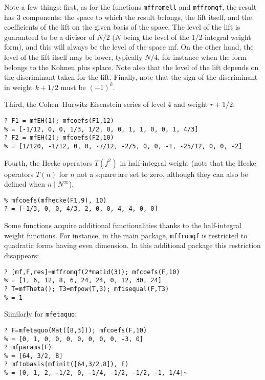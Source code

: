 \documentclass[11pt]{article}
\def\kbd#1{{\tt #1}}
\begin{document}
Note a few things: first, as for the functions \kbd{mffromell} and
\kbd{mffromqf}, the result has 3 components: the space to which the result
belongs, the lift itself, and the coefficients of the lift on the given basis
of the space. The level of the lift is guaranteed to be a divisor of $N/2$
($N$ being the level of the 1/2-integral weight form), and this will always
be the level of the space mf. On the other hand, the level of the lift itself
may be lower, typically $N/4$, for instance when the form belongs to the
Kohnen plus splace. Note also that the level of the lift depends on the
discriminant taken for the lift. Finally, note that the sign of the
discriminant in weight $k+1/2$ must be $(-1)^k$.

\smallskip

Third, the Cohen--Hurwitz Eisenstein series of level $4$ and weight $r+1/2$:

\begin{verbatim}
? F1 = mfEH(1); mfcoefs(F1,12)
% = [-1/12, 0, 0, 1/3, 1/2, 0, 0, 1, 1, 0, 0, 1, 4/3]
? F2 = mfEH(2); mfcoefs(F2,10)
% = [1/120, -1/12, 0, 0, -7/12, -2/5, 0, 0, -1, -25/12, 0, 0, -2]
\end{verbatim}

\smallskip
  
Fourth, the Hecke operators $T(f^2)$ in half-integral weight (note
that the Hecke operators $T(n)$ for $n$ not a square are set to zero,
although they can also be defined when $n\mid N^\infty$).

\begin{verbatim}
% mfcoefs(mfhecke(F1,9), 10)
? = [-1/3, 0, 0, 4/3, 2, 0, 0, 4, 4, 0, 0]
\end{verbatim}

\smallskip

Some functions acquire additional functionalities thanks to the half-integral
weight functions. For instance, in the main package, \kbd{mffromqf} is
restricted to quadratic forms having even dimension. In this additional
package this restriction disappears:

\begin{verbatim}
? [mf,F,res]=mffromqf(2*matid(3)); mfcoefs(F,10)
% = [1, 6, 12, 8, 6, 24, 24, 0, 12, 30, 24]
? T=mfTheta(); T3=mfpow(T,3); mfisequal(F,T3)
% = 1
\end{verbatim}

Similarly for \kbd{mfetaquo}:

\begin{verbatim}
? F=mfetaquo(Mat([8,3])); mfcoefs(F,10)
% = [0, 1, 0, 0, 0, 0, 0, 0, 0, -3, 0]
? mfparams(F)
% = [64, 3/2, 8]
? mftobasis(mfinit([64,3/2,8]), F)
% = [0, 1, 2, -1/2, 0, -1/4, -1/2, -1/2, -1, 1/4]~
\end{verbatim}
\end{document}
